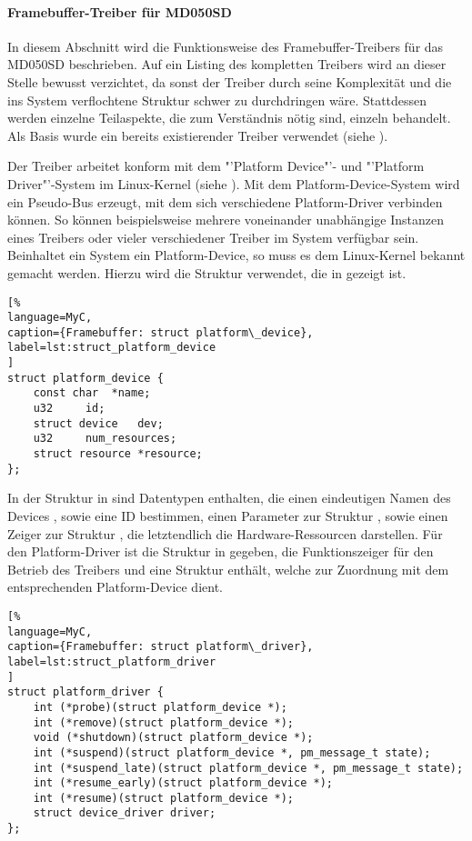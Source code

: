 \paragraph{Framebuffer-Treiber für MD050SD}
\label{cha:framebuffer}
In diesem Abschnitt wird die Funktionsweise des Framebuffer-Treibers für das MD050SD beschrieben. Auf ein Listing des kompletten Treibers wird an dieser Stelle bewusst verzichtet, da sonst der Treiber durch seine Komplexität und die ins System verflochtene Struktur schwer zu durchdringen wäre. Stattdessen werden einzelne Teilaspekte, die zum Verständnis nötig sind, einzeln behandelt. Als Basis wurde ein bereits existierender Treiber verwendet (siehe \cite{Schlegel2013c}).

Der Treiber arbeitet konform mit dem "'Platform Device"'- und "'Platform Driver"'-System im Linux-Kernel (siehe \cite{LinuxKernelPlatformDeviceDriver}). Mit dem Platform-Device-System wird ein Pseudo-Bus erzeugt, mit dem sich verschiedene Platform-Driver verbinden können. So können beispielsweise mehrere voneinander unabhängige Instanzen eines Treibers oder vieler verschiedener Treiber im System verfügbar sein. Beinhaltet ein System ein Platform-Device, so muss es dem Linux-Kernel bekannt gemacht werden. Hierzu wird die Struktur  verwendet, die in  gezeigt ist.

\begin{lstlisting}[%
language=MyC,
caption={Framebuffer: struct platform\_device},
label=lst:struct_platform_device
]
struct platform_device {
	const char	*name;
	u32		id;
	struct device	dev;
	u32		num_resources;
	struct resource	*resource;
};
\end{lstlisting}

In der Struktur in  sind Datentypen enthalten, die einen eindeutigen Namen des Devices , sowie eine ID   bestimmen, einen Parameter zur Struktur , sowie einen Zeiger zur Struktur , die letztendlich die Hardware-Ressourcen darstellen. Für den Platform-Driver ist die Struktur  in  gegeben, die Funktionszeiger für den Betrieb des Treibers und eine Struktur  enthält, welche zur Zuordnung mit dem entsprechenden Platform-Device dient.
\begin{lstlisting}[%
language=MyC,
caption={Framebuffer: struct platform\_driver},
label=lst:struct_platform_driver
]
struct platform_driver {
	int (*probe)(struct platform_device *);
	int (*remove)(struct platform_device *);
	void (*shutdown)(struct platform_device *);
	int (*suspend)(struct platform_device *, pm_message_t state);
	int (*suspend_late)(struct platform_device *, pm_message_t state);
	int (*resume_early)(struct platform_device *);
	int (*resume)(struct platform_device *);
	struct device_driver driver;
};
\end{lstlisting}

